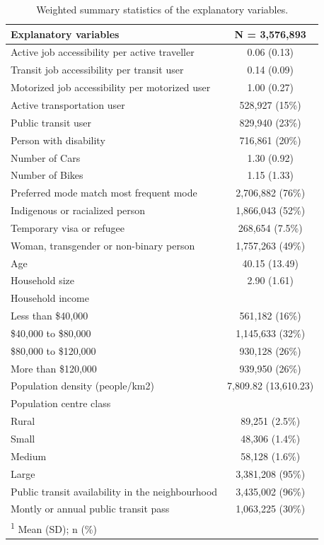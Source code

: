 \documentclass[preprint, 3p,
authoryear]{elsarticle} %
\begin{document}
\begin{table}

\caption{\label{tab:vardescriptions}\label{tab:var-description}Weighted summary statistics of the explanatory variables.}
\centering
\begin{tabular}[t]{lc}
\toprule
Explanatory variables & \textbf{N = 3,576,893}\\
\midrule
Active job accessibility per active traveller & 0.06 (0.13)\\
Transit job accessibility per transit user & 0.14 (0.09)\\
Motorized job accessibility per motorized user & 1.00 (0.27)\\
Active transportation user & 528,927 (15\%)\\
Public transit user & 829,940 (23\%)\\
\addlinespace
Person with disability & 716,861 (20\%)\\
Number of Cars & 1.30 (0.92)\\
Number of Bikes & 1.15 (1.33)\\
Preferred mode match most frequent mode & 2,706,882 (76\%)\\
Indigenous or racialized person & 1,866,043 (52\%)\\
\addlinespace
Temporary visa or refugee & 268,654 (7.5\%)\\
Woman, transgender or non-binary person & 1,757,263 (49\%)\\
Age & 40.15 (13.49)\\
Household size & 2.90 (1.61)\\
Household income & \\
\addlinespace
\hspace{1em}Less than \$40,000 & 561,182 (16\%)\\
\hspace{1em}\$40,000 to \$80,000 & 1,145,633 (32\%)\\
\hspace{1em}\$80,000 to \$120,000 & 930,128 (26\%)\\
\hspace{1em}More than \$120,000 & 939,950 (26\%)\\
Population density (people/km2) & 7,809.82 (13,610.23)\\
\addlinespace
Population centre class & \\
\hspace{1em}Rural & 89,251 (2.5\%)\\
\hspace{1em}Small & 48,306 (1.4\%)\\
\hspace{1em}Medium & 58,128 (1.6\%)\\
\hspace{1em}Large & 3,381,208 (95\%)\\
\addlinespace
Public transit availability in the neighbourhood & 3,435,002 (96\%)\\
Montly or annual public transit pass & 1,063,225 (30\%)\\
\bottomrule
\multicolumn{2}{l}{\rule{0pt}{1em}\textsuperscript{1} Mean (SD); n (\%)}\\
\end{tabular}
\end{table}
\end{document}
